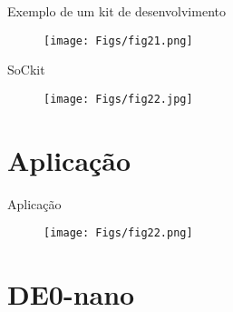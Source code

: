 \documentclass[aspectratio=169]{beamer}
\begin{document}

\begin{frame}{Exemplo de um kit de desenvolvimento}
	\justifying
	
	
	\begin{figure}[h]
		\centering
		\texttt{[image: Figs/fig21.png]}
	\end{figure}	
	
\end{frame}

\begin{frame}{SoCkit}
	\justifying
	
	
	\begin{figure}[h]
		\centering
		\texttt{[image: Figs/fig22.jpg]}
	\end{figure}	
	
\end{frame}


\section{Aplicação}

\begin{frame}{Aplicação}
	\justifying
	
	
	\begin{figure}[h]
		\centering
		\texttt{[image: Figs/fig22.png]}
	\end{figure}	
	
\end{frame}

\section{DE0-nano}
\end{document}
